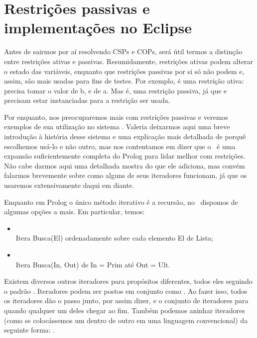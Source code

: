 \documentclass{article}
\begin{document}
\section{Restrições passivas e implementações no Eclipse}

Antes de sairmos por aí resolvendo CSPs e COPs, será útil termos a distinção entre restrições ativas
e passivas. Resumidamente, restrições ativas podem alterar o estado das variáveis, enquanto que
restrições passivas por si só não podem e, assim, são mais usadas para fins de testes. Por exemplo,
 é uma restrição ativa:  precisa tomar o valor de b, e  de a. Mas
 é, uma restrição passiva, já que  e  precisam estar instanciadas
para a restrição ser usada.

Por enquanto, nos preocuparemos mais com restrições passivas e veremos exemplos de sua utilização no sistema \eclipse. Valeria deixarmos aqui uma breve introdução à história desse sistema e uma explicação mais detalhada de porquê escolhemos usá-lo e não outro, mas nos contentamos em dizer que o \eclipse\ é uma expansão suficientemente completa do Prolog para lidar melhor com restrições. Não cabe darmos aqui uma detalhada mostra do que ele adiciona, mas convém falarmos brevemente
sobre como alguns de seus iteradores funcionam, já que os usaremos extensivamente daqui em diante.

Enquanto em Prolog o único método iterativo é a recursão, no \eclipse\ dispomos de algumas opções a mais. Em particular, temos:

\begin{itemize}
  \item {}
    \\ Itera Busca(El) ordenadamente sobre cada elemento El de Lista;
  \item {}
    \\ Itera Busca(In, Out) de In = Prim até Out = Ult.
\end{itemize}

Existem diversos outros iteradores para propósitos diferentes, todos eles seguindo o padrão  . Iteradores podem ser postos em conjunto como . Ao fazer isso, todos os iteradores dão o passo junto, por assim dizer, e o conjunto de iteradores para quando qualquer um deles chegar ao fim. Também podemos aninhar iteradores (como se colocássemos um  dentro de outro em uma linguagem
convencional) da seguinte forma: .
\end{document}

